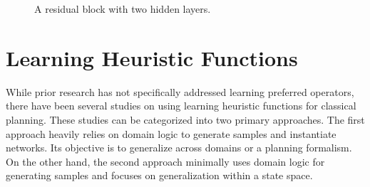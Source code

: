 \documentclass[ppgc,diss,english]{iiufrgs}
\begin{document}
\begin{figure}[tb]
\caption[A residual block]{A residual block with two hidden layers.}
\centering
{}
\label{fig:residual-block}
\end{figure}

\section{Learning Heuristic Functions}
\label{sec:related-h}
While prior research has not specifically addressed learning preferred operators, there have been several studies on using learning heuristic functions for classical planning. These studies can be categorized into two primary approaches.
The first approach heavily relies on domain logic to generate samples and instantiate networks. Its objective is to generalize across domains or a planning formalism.
On the other hand, the second approach minimally uses domain logic for generating samples and focuses on generalization within a state space.
\end{document}
